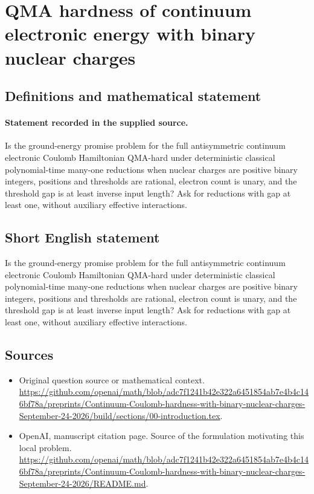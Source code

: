 \documentclass[11pt]{article}
\begin{document}
\section*{QMA hardness of continuum electronic energy with binary nuclear charges}\label{30007211}
\subsection{Definitions and mathematical statement}
\paragraph{Statement recorded in the supplied source.}
Is the ground-energy promise problem for the full antisymmetric continuum electronic Coulomb Hamiltonian QMA-hard under deterministic classical polynomial-time many-one reductions when nuclear charges are positive binary integers, positions and thresholds are rational, electron count is unary, and the threshold gap is at least inverse input length? Ask for reductions with gap at least one, without auxiliary effective interactions.
\subsection{Short English statement}
Is the ground-energy promise problem for the full antisymmetric continuum electronic Coulomb Hamiltonian QMA-hard under deterministic classical polynomial-time many-one reductions when nuclear charges are positive binary integers, positions and thresholds are rational, electron count is unary, and the threshold gap is at least inverse input length? Ask for reductions with gap at least one, without auxiliary effective interactions.
\subsection{Sources}
\begin{itemize}
\item[S1] Original question source or mathematical context.
\url{https://github.com/openai/math/blob/adc7f1241b42e322a6451854ab7e4b4c146bf78a/preprints/Continuum-Coulomb-hardness-with-binary-nuclear-charges-September-24-2026/build/sections/00-introduction.tex}.
\item[S2] OpenAI, manuscript citation page. Source of the formulation motivating this local problem.
\url{https://github.com/openai/math/blob/adc7f1241b42e322a6451854ab7e4b4c146bf78a/preprints/Continuum-Coulomb-hardness-with-binary-nuclear-charges-September-24-2026/README.md}.
\end{itemize}
\end{document}
